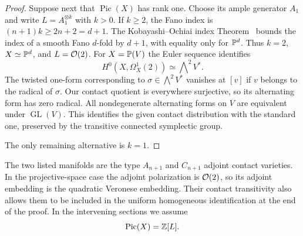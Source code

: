 \begin{proof}
Suppose next that $\operatorname{Pic}(X)$ has rank one. Choose its
ample generator $A_1$ and write $L=A_1^{\otimes k}$ with $k>0$.
If $k\geq2$, the Fano index is $(n+1)k\geq2n+2=d+1$.
The Kobayashi--Ochiai index Theorem~\cite{KO1973} bounds the index of
a smooth Fano $d$-fold by $d+1$, with equality only for
$\mathbb P^d$. Thus $k=2$, $X\simeq\mathbb P^d$, and $L=\mathcal O(2)$.
For $X=\mathbb P(V)$ the Euler sequence identifies
\[
H^0(X,\Omega_X^1(2))\simeq\bigwedge\nolimits^2 V^*.
\]
The twisted one-form corresponding to $\sigma\in\bigwedge^2V^*$
vanishes at $[v]$ if $v$ belongs to the radical of $\sigma$.
Our contact quotient is everywhere surjective, so its alternating
form has zero radical. All nondegenerate alternating forms on $V$
are equivalent under $\operatorname{GL}(V)$. This identifies the
given contact distribution with the standard one, preserved by
the transitive connected symplectic group.

The only remaining alternative is $k=1$.
\end{proof}

The two listed manifolds are the type $A_{n+1}$ and $C_{n+1}$ adjoint
contact varieties. In the projective-space case the adjoint
polarization is $\mathcal O(2)$, so its adjoint embedding is the quadratic
Veronese embedding. Their contact transitivity also allows them to
be included in the uniform homogeneous identification at the end
of the proof. In the intervening sections we assume
\begin{equation}\label{red:primitive}
\operatorname{Pic}(X)=\mathbb Z[L].
\end{equation}
